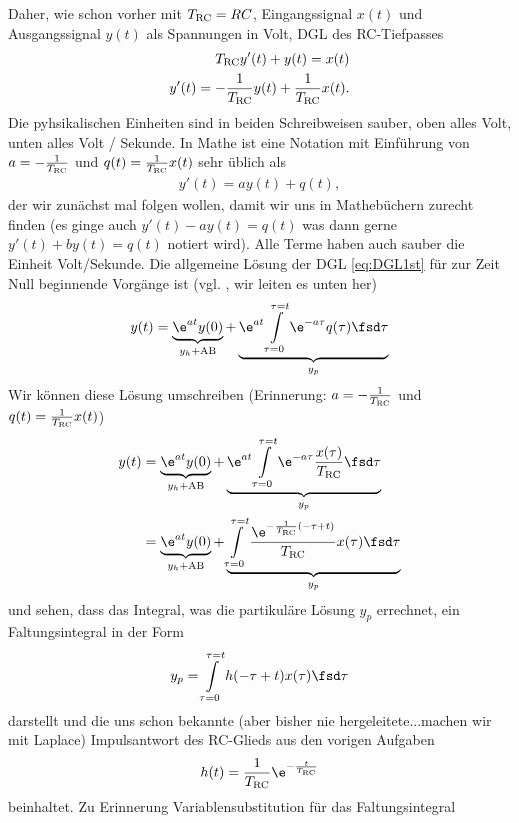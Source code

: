 Daher, wie schon vorher mit $T_\text{RC}=R C$, Eingangssignal $x(t)$ und Ausgangssignal $y(t)$ als Spannungen in Volt, DGL des RC-Tiefpasses
\begin{align}
T_\text{RC} y'(t) + y(t) = x(t)\\
y'(t) = - \frac{1}{T_\text{RC}}y(t) + \frac{1}{T_\text{RC}} x(t).
\end{align}
Die pyhsikalischen Einheiten sind in beiden Schreibweisen sauber, oben alles Volt, unten alles Volt / Sekunde.
%
In Mathe ist eine Notation mit Einführung von $a = -\frac{1}{T_\text{RC}}$ und $q(t) = \frac{1}{T_\text{RC}} x(t)$ sehr üblich als
\begin{align}
\label{eq:DGL1st}
y'(t) = a y(t) + q(t),
\end{align}
der wir zunächst mal folgen wollen, damit wir uns in Mathebüchern zurecht finden (es ginge auch $y'(t) -a y(t) =  q(t)$ was dann gerne $y'(t) + b y(t) =  q(t)$ notiert wird). Alle Terme haben auch sauber die Einheit Volt/Sekunde.
%
Die allgemeine Lösung der DGL \eqref{eq:DGL1st} für zur Zeit Null beginnende Vorgänge ist (vgl. \cite[S.19, Glg. (4)]{Strang2014}, wir leiten es unten her)
\begin{align}
\label{eq:DGL1st_full_solution_with_conv}
y(t) = \underbrace{\e^{a t} y(0)}_{y_h+\text{AB}} + \underbrace{\e^{a t}\int\limits_{\tau=0}^{\tau=t} \e^{-a \tau} q(\tau) \fsd \tau}_{y_p}
\end{align}
Wir können diese Lösung umschreiben (Erinnerung: $a = -\frac{1}{T_\text{RC}}$ und $q(t) = \frac{1}{T_\text{RC}} x(t)$)
\begin{align}
y(t) &= \underbrace{\e^{a t} y(0)}_{y_h+\text{AB}} + \underbrace{\e^{a t}\int\limits_{\tau=0}^{\tau=t} \e^{-a \tau} \frac{x(\tau)}{\TRC} \fsd \tau}_{y_p}\\
&= \underbrace{\e^{a t} y(0)}_{y_h+\text{AB}} + \underbrace{\int\limits_{\tau=0}^{\tau=t} \frac{\e^{-\frac{1}{\TRC} (-\tau + t)}}{\TRC} x(\tau) \fsd \tau}_{y_p}
\end{align}
und sehen, dass das Integral, was die partikuläre Lösung $y_p$ errechnet, ein Faltungsintegral in der Form
\begin{align}
y_p = \int\limits_{\tau=0}^{\tau=t} h(-\tau+t) x(\tau) \fsd\tau
\end{align}
darstellt und die uns schon bekannte (aber bisher nie hergeleitete...machen wir mit Laplace) Impulsantwort des RC-Glieds aus den vorigen Aufgaben
\begin{align}
h(t) = \frac{1}{\TRC} \e^{-\frac{t}{\TRC}}
\end{align}
beinhaltet.
%
Zu Erinnerung Variablensubstitution für das Faltungsintegral
